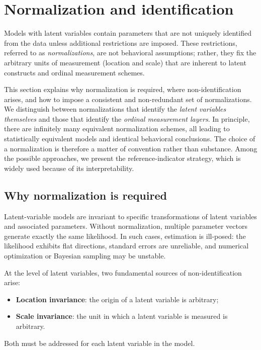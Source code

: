 \documentclass[12pt,a4paper]{article}
\begin{document}
\section{Normalization and identification}
\label{sec:normalization}

Models with latent variables contain parameters that are not uniquely
identified from the data unless additional restrictions are imposed.
These restrictions, referred to as \emph{normalizations}, are not
behavioral assumptions; rather, they fix the arbitrary units of
measurement (location and scale) that are inherent to latent
constructs and ordinal measurement schemes.

This section explains why normalization is required, where
non-identification arises, and how to impose a consistent and
non-redundant set of normalizations. We distinguish between
normalizations that identify the \emph{latent variables themselves}
and those that identify the \emph{ordinal measurement layers}. In
principle, there are infinitely many equivalent normalization schemes,
all leading to statistically equivalent models and identical
behavioral conclusions. The choice of a normalization is therefore a
matter of convention rather than substance. Among the possible
approaches, we present the reference-indicator strategy, which is
widely used because of its interpretability.

\subsection{Why normalization is required}

Latent-variable models are invariant to specific transformations of
latent variables and associated parameters. Without normalization,
multiple parameter vectors generate exactly the same likelihood. In
such cases, estimation is ill-posed: the likelihood exhibits flat
directions, standard errors are unreliable, and numerical optimization
or Bayesian sampling may be unstable.

At the level of latent variables, two fundamental sources of
non-identification arise:
\begin{itemize}
  \item \textbf{Location invariance}: the origin of a latent variable
    is arbitrary;
  \item \textbf{Scale invariance}: the unit in which a latent variable
    is measured is arbitrary.
\end{itemize}
Both must be addressed for each latent variable in the model.
\end{document}
